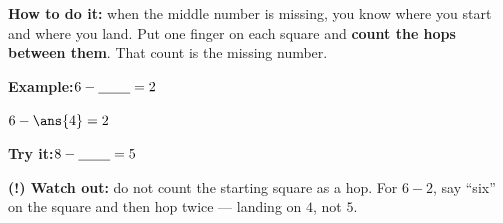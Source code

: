 \documentclass[12pt]{article}
\begin{document}
\begin{formulabox}
\textbf{How to do it:} when the middle number is missing, you know where you
start and where you land. Put one finger on each square and \textbf{count the
hops between them}. That count is the missing number.
\end{formulabox}
\begin{examplebox}
\textbf{Example:}\quad $6 - \underline{\hspace{0.8cm}} = 2$

$6 - \ans{4} = 2$
\end{examplebox}
\begin{tryitbox}
\textbf{Try it:}\quad $8 - \underline{\hspace{0.8cm}} = 5$\\[2pt]
\end{tryitbox}

\begin{watchoutbox}
\textbf{(!) Watch out:} do not count the starting square as a hop. For
$6 - 2$, say ``six'' on the square and then hop twice --- landing on $4$, not
$5$.
\end{watchoutbox}
\end{document}
